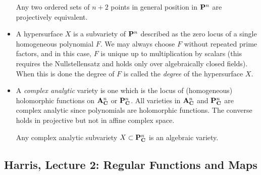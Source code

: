 \begin{itemize}
  \begin{theorem}
    Any two ordered sets of $n+2$ points in general position in $\P^n$ are projectively equivalent.
  \end{theorem}

\item
  A hypersurface $X$ is a subvariety of $\P^n$ described as the zero locus of a single homogeneous polynomial $F$. We may always choose $F$ without repeated prime factors, and in this case, $F$ is unique up to multiplication by scalars (this requires the Nullstellensatz and holds only over algebraically closed fields). When this is done the degree of $F$ is called the \emph{degree} of the hypersurface $X$.

\item
  A \emph{complex analytic} variety is one which is the locus of (homogeneous) holomorphic functions on $\A_\C^n$ or $\P_\C^n$. All varieties in $\A_\C^n$ and $\P_\C^n$ are complex analytic since polynomials are holomorphic functions. The converse holds in projective but not in affine complex space.

  \begin{theorem}
    Any complex analytic subvariety $X \subset \P^n_\C$ is an algebraic variety.
  \end{theorem}
\end{itemize}

\subsection{Harris, Lecture 2: Regular Functions and Maps}

